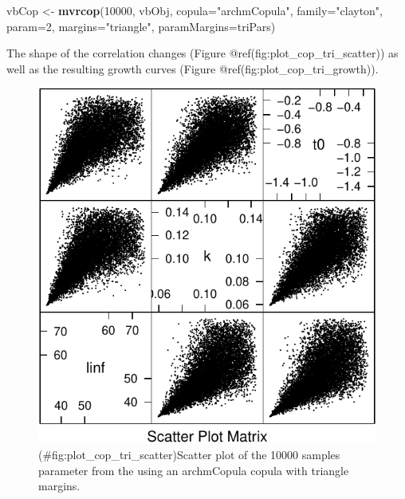 \documentclass[
]{book}
\newenvironment{Shaded}{\begin{snugshade}}{\end{snugshade}}
\newcommand{\AttributeTok}[1]{\textcolor[rgb]{0.13,0.29,0.53}{#1}}
\newcommand{\DecValTok}[1]{\textcolor[rgb]{0.00,0.00,0.81}{#1}}
\newcommand{\FunctionTok}[1]{\textcolor[rgb]{0.13,0.29,0.53}{\textbf{#1}}}
\newcommand{\NormalTok}[1]{#1}
\newcommand{\OtherTok}[1]{\textcolor[rgb]{0.56,0.35,0.01}{#1}}
\newcommand{\StringTok}[1]{\textcolor[rgb]{0.31,0.60,0.02}{#1}}
\begin{document}
\begin{Shaded}
\begin{Highlighting}[]
\NormalTok{vbCop }\OtherTok{\textless{}{-}} \FunctionTok{mvrcop}\NormalTok{(}\DecValTok{10000}\NormalTok{, vbObj, }\AttributeTok{copula=}\StringTok{"archmCopula"}\NormalTok{, }\AttributeTok{family=}\StringTok{"clayton"}\NormalTok{, }\AttributeTok{param=}\DecValTok{2}\NormalTok{, }
                \AttributeTok{margins=}\StringTok{"triangle"}\NormalTok{, }\AttributeTok{paramMargins=}\NormalTok{triPars)}
\end{Highlighting}
\end{Shaded}

The shape of the correlation changes (Figure @ref(fig:plot\_cop\_tri\_scatter)) as well as the resulting growth curves (Figure @ref(fig:plot\_cop\_tri\_growth)).

\begin{figure}
\centering
\includegraphics{_main_files/figure-latex/plot_cop_tri_scatter-1.pdf}
\caption{(\#fig:plot\_cop\_tri\_scatter)Scatter plot of the 10000 samples parameter from the using an archmCopula copula with triangle margins.}
\end{figure}
\end{document}
